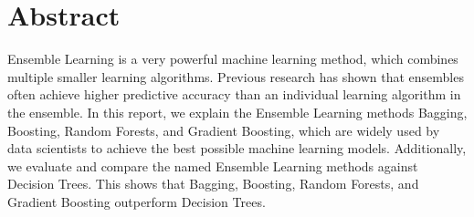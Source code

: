 \section*{Abstract}

Ensemble Learning is a very powerful machine learning method, which combines
multiple smaller learning algorithms. Previous research has shown that 
ensembles often achieve higher predictive accuracy than an individual learning
algorithm in the ensemble.
In this report, we explain the Ensemble Learning methods Bagging,
Boosting, Random Forests, and Gradient Boosting, which are widely 
used by data scientists to achieve the best possible machine learning
models. Additionally, we evaluate and compare the named Ensemble
Learning methods against Decision Trees. This shows that Bagging,
Boosting, Random Forests, and Gradient Boosting outperform Decision
Trees.
